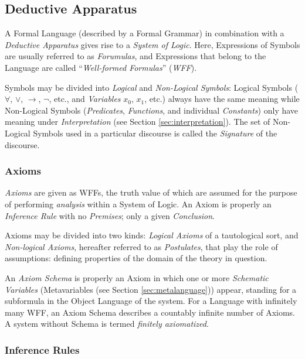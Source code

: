 \documentclass{article}
\begin{document}
\subsection{Deductive Apparatus}
\label{subsec:deductive_apparatus}

A Formal Language (described by a Formal Grammar) in combination with
a \emph{Deductive Apparatus} gives rise to a \emph{System of
  Logic}. Here, Expressions of Symbols are usually referred to as
\emph{Forumulas}, and Expressions that belong to the Language are
called ``\emph{Well-formed Formulas}'' (\emph{WFF}).

Symbols may be divided into \emph{Logical} and \emph{Non-Logical
  Symbols}: Logical Symbols ($\forall$, $\vee$, $\rightarrow$, $\neg$,
etc., and \emph{Variables} $x_0$, $x_1$, etc.) always have the same
meaning while Non-Logical Symbols (\emph{Predicates},
\emph{Functions}, and individual \emph{Constants}) only have meaning
under \emph{Interpretation} (see Section
\ref{sec:interpretation}). The set of Non-Logical Symbols used in a
particular discourse is called the \emph{Signature} of the
discourse.

\subsubsection{Axioms}

\emph{Axioms} are given as WFFs, the truth value of which are assumed
for the purpose of performing \emph{analysis} within a System of
Logic. An Axiom is properly an \emph{Inference Rule} with no
\emph{Premises}; only a given \emph{Conclusion}.

Axioms may be divided into two kinds: \emph{Logical Axioms} of a
tautological sort, and \emph{Non-logical Axioms}, hereafter referred
to as \emph{Postulates}, that play the role of assumptions: defining
properties of the domain of the theory in question.

An \emph{Axiom Schema} is properly an Axiom in which one or more
\emph{Schematic Variables} (Metavariables (see Section
\ref{sec:metalanguage})) appear, standing for a subformula in the
Object Language of the system. For a Language with infinitely many
WFF, an Axiom Schema describes a countably infinite number of
Axioms. A system without Schema is termed \emph{finitely axiomatized}.

\subsubsection{Inference Rules}
\end{document}

